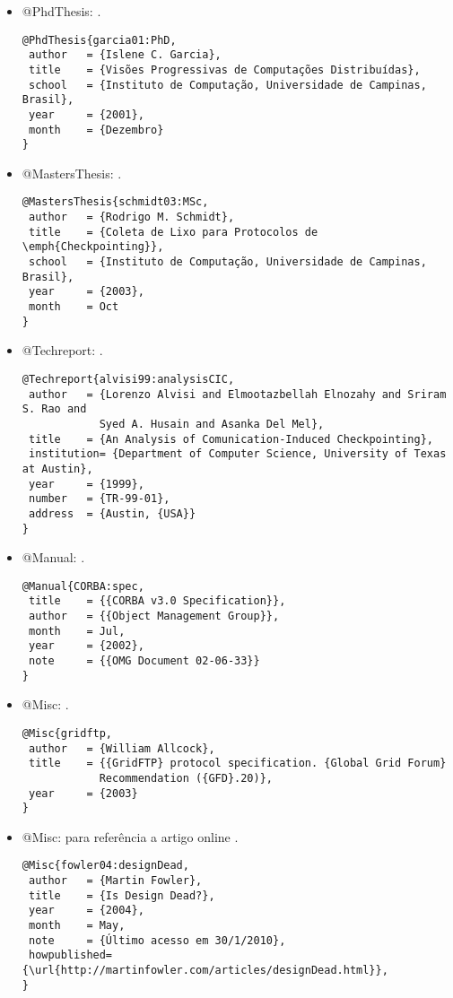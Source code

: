 \begin{itemize}
\item @PhdThesis: \cite{garcia01:PhD}.
{\scriptsize\begin{verbatim}
@PhdThesis{garcia01:PhD,
 author   = {Islene C. Garcia},
 title    = {Visões Progressivas de Computações Distribuídas},
 school   = {Instituto de Computação, Universidade de Campinas, Brasil},
 year     = {2001},
 month    = {Dezembro}
}
\end{verbatim}
}

\item @MastersThesis: \cite{schmidt03:MSc}.
{\scriptsize\begin{verbatim}
@MastersThesis{schmidt03:MSc,
 author   = {Rodrigo M. Schmidt},
 title    = {Coleta de Lixo para Protocolos de \emph{Checkpointing}},
 school   = {Instituto de Computação, Universidade de Campinas, Brasil},
 year     = {2003},
 month    = Oct
}
\end{verbatim}
}

\item @Techreport: \cite{alvisi99:analysisCIC}.
{\scriptsize\begin{verbatim}
@Techreport{alvisi99:analysisCIC,
 author   = {Lorenzo Alvisi and Elmootazbellah Elnozahy and Sriram S. Rao and
            Syed A. Husain and Asanka Del Mel},
 title    = {An Analysis of Comunication-Induced Checkpointing},
 institution= {Department of Computer Science, University of Texas at Austin},
 year     = {1999},
 number   = {TR-99-01},
 address  = {Austin, {USA}}
}
\end{verbatim}
}

\item @Manual: \cite{CORBA:spec}.
{\scriptsize\begin{verbatim}
@Manual{CORBA:spec,
 title    = {{CORBA v3.0 Specification}},
 author   = {{Object Management Group}},
 month    = Jul,
 year     = {2002},
 note     = {{OMG Document 02-06-33}}
}
\end{verbatim}
}

\item @Misc: \cite{gridftp}.
{\scriptsize\begin{verbatim}
@Misc{gridftp,
 author   = {William Allcock},
 title    = {{GridFTP} protocol specification. {Global Grid Forum}
            Recommendation ({GFD}.20)},
 year     = {2003}
}
\end{verbatim}
}

\item @Misc: para referência a artigo online \cite{fowler04:designDead}.
{\scriptsize\begin{verbatim}
@Misc{fowler04:designDead,
 author   = {Martin Fowler},
 title    = {Is Design Dead?},
 year     = {2004},
 month    = May,
 note     = {Último acesso em 30/1/2010},
 howpublished= {\url{http://martinfowler.com/articles/designDead.html}},
}
\end{verbatim}
}


\end{itemize}
